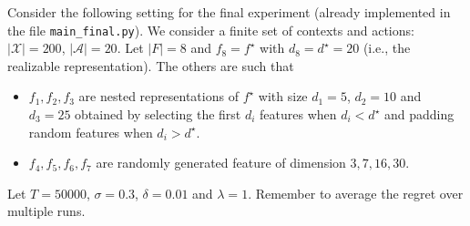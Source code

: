 \documentclass[a4paper]{article}
\begin{document}
Consider the following setting for the final experiment (already implemented in the file \texttt{main\_final.py}).
We consider a finite set of contexts and actions: $|\mathcal{X}| = 200$, $|\mathcal{A}|=20$.
Let $|F| = 8$ and $f_8 = f^\star$ with $d_8 = d^\star = 20$ (i.e., the realizable representation). The others are such that
\begin{itemize}
   \item $f_1, f_2, f_3$ are nested representations of $f^\star$ with size $d_1 = 5$, $d_2 = 10$ and $d_3=25$ obtained by selecting the first $d_i$ features when $d_i < d^\star$ and padding random features when $d_i > d^\star$.
   \item $f_4, f_5, f_6, f_7$ are randomly generated feature of dimension $3, 7, 16, 30$.
\end{itemize}
Let $T=50000$, $\sigma = 0.3$, $\delta = 0.01$ and $\lambda=1$. Remember to average the regret over multiple runs.
\end{document}
